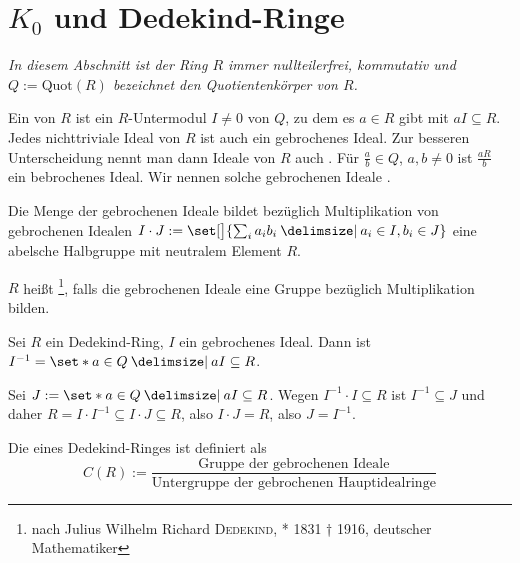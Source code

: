 \section{$K_0$ und Dedekind-Ringe} %
\label{sec:2}
\emph{In diesem Abschnitt ist der Ring $R$ immer nullteilerfrei, kommutativ und $Q := \mathrm{Quot}(R)$ bezeichnet den Quotientenkörper von $R$.}

\begin{definition}[{name=[{gebrochenes Ideal}]}]
	Ein  von $R$ ist ein $R$-Untermodul $I \neq 0$ von $Q$, zu dem es $a \in R$ gibt mit $a I \subseteq R$.
	Jedes nichttriviale Ideal von $R$ ist auch ein gebrochenes Ideal.
	Zur besseren Unterscheidung nennt man dann Ideale von $R$ auch .
	Für $\frac{a}{b} \in Q$, $a,b\neq 0$ ist $\frac{a R}{b}$ ein bebrochenes Ideal.
	Wir nennen solche gebrochenen Ideale .
\end{definition}

\begin{bemerkung}
	Die Menge der gebrochenen Ideale bildet bezüglich Multiplikation von gebrochenen Idealen $I \cdot J := \set[\big]{\sum_{i} a_i b_i \given a_i \in I, b_i \in J}$ eine abelsche Halbgruppe mit neutralem Element $R$.
\end{bemerkung}

\begin{definition}[{name=[{Dedekind-Ring}]}]
	$R$ heißt \footnote{nach Julius Wilhelm Richard \textsc{Dedekind}, * 1831 † 1916, deutscher Mathematiker}, falls die gebrochenen Ideale eine Gruppe bezüglich Multiplikation bilden. 
\end{definition}

\begin{lemma}[{name=[Invereses eines gebrochenen Ideals]}]
	Sei $R$ ein Dedekind-Ring, $I$ ein gebrochenes Ideal.
	Dann ist $I^{-1} = \set*{a \in Q \given a I \subseteq R}$.
\end{lemma}
\begin{beweis}
	Sei $J:= \set*{a \in Q \given a I \subseteq R}$.
	Wegen $I^{-1} \cdot I \subseteq R$ ist $I^{-1} \subseteq J$ und daher $R = I \cdot I^{-1} \subseteq I \cdot J \subseteq R$, also $I \cdot J =R$, also $J=I^{-1}$.
\end{beweis}

\begin{definition}[{name=[{Klassengruppe}]}]
	Die  eines Dedekind-Ringes ist definiert als 
	\[
		C(R):=  \frac{\text{Gruppe der gebrochenen Ideale}}{\text{Untergruppe der gebrochenen Hauptidealringe}} 
	\]
\end{definition}

